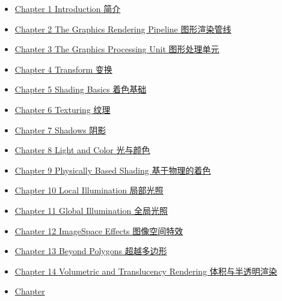 \documentclass[
  paper=a4,
  ,captions=tableheading
]{scrartcl}
\providecommand{\tightlist}{%
  \setlength{\itemsep}{0pt}\setlength{\parskip}{0pt}}
\begin{document}
\begin{itemize}
\begin{itemize}
    \begin{itemize}
    \tightlist
    \item
      \hyperref[Chapter-1-Introduction-ux7b80ux4ecb]{Chapter 1
      Introduction 简介}
    \item
      \hyperref[Chapter-2-The-Graphics-Rendering-Pipeline-ux56feux5f62ux6e32ux67d3ux7ba1ux7ebf]{Chapter
      2 The Graphics Rendering Pipeline 图形渲染管线}
    \item
      \hyperref[Chapter-3-The-Graphics-Processing-Unit-ux56feux5f62ux5904ux7406ux5355ux5143]{Chapter
      3 The Graphics Processing Unit 图形处理单元}
    \item
      \hyperref[Chapter-4-Transform-ux53d8ux6362]{Chapter 4 Transform
      变换}
    \item
      \hyperref[Chapter-5-Shading-Basics-ux7740ux8272ux57faux7840]{Chapter
      5 Shading Basics 着色基础}
    \item
      \hyperref[Chapter-6-Texturing-ux7eb9ux7406]{Chapter 6 Texturing
      纹理}
    \item
      \hyperref[Chapter-7-Shadows-ux9634ux5f71]{Chapter 7 Shadows 阴影}
    \item
      \hyperref[Chapter-8-Light-and-Color-ux5149ux4e0eux989cux8272]{Chapter
      8 Light and Color 光与颜色}
    \item
      \hyperref[Chapter-9-Physically-Based-Shading-ux57faux4e8eux7269ux7406ux7684ux7740ux8272]{Chapter
      9 Physically Based Shading 基于物理的着色}
    \item
      \hyperref[Chapter-10-Local-Illumination-ux5c40ux90e8ux5149ux7167]{Chapter
      10 Local Illumination 局部光照}
    \item
      \hyperref[Chapter-11-Global-Illumination-ux5168ux5c40ux5149ux7167]{Chapter
      11 Global Illumination 全局光照}
    \item
      \hyperref[Chapter-12-ImageSpace-Effects-ux56feux50cfux7a7aux95f4ux7279ux6548]{Chapter
      12 ImageSpace Effects 图像空间特效}
    \item
      \hyperref[Chapter-13-Beyond-Polygons-ux8d85ux8d8aux591aux8fb9ux5f62]{Chapter
      13 Beyond Polygons 超越多边形}
    \item
      \hyperref[Chapter-14-Volumetric-and-Translucency-Rendering-ux4f53ux79efux4e0eux534aux900fux660eux6e32ux67d3]{Chapter
      14 Volumetric and Translucency Rendering 体积与半透明渲染}
    \item
      \hyperref[Chapter-15-NonPhotorealistic-Rendering-ux975eux771fux5b9eux611fux6e32ux67d3]{Chapter
}
\end{itemize}
\end{itemize}
\end{itemize}
\end{document}
